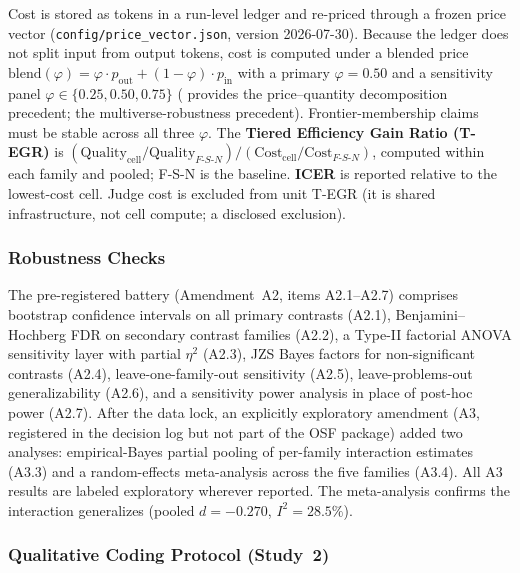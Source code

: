 \documentclass[12pt,a4paper]{article}
\newcommand{\phiBlend}{\varphi}
\begin{document}
Cost is stored as tokens in a run-level ledger and re-priced through a frozen
price vector (\texttt{config/price\_vector.json}, version 2026-07-30). Because
the ledger does not split input from output tokens, cost is computed under a
blended price $\mathrm{blend}(\phiBlend) = \phiBlend \cdot p_{\mathrm{out}} +
(1 - \phiBlend) \cdot p_{\mathrm{in}}$ with a primary $\phiBlend = 0.50$ and a
sensitivity panel $\phiBlend \in \{0.25, 0.50, 0.75\}$ (\citealt{Diewert1976}
provides the price--quantity decomposition precedent; \citealt{SteegenEtAl2016}
the multiverse-robustness precedent). Frontier-membership claims must be stable
across all three $\phiBlend$. The \textbf{Tiered Efficiency Gain Ratio (T-EGR)}
is $(\mathrm{Quality}_{\mathrm{cell}} / \mathrm{Quality}_{F\text{-}S\text{-}N})
/ (\mathrm{Cost}_{\mathrm{cell}} / \mathrm{Cost}_{F\text{-}S\text{-}N})$,
computed within each family and pooled; F-S-N is the baseline. \textbf{ICER} is
reported relative to the lowest-cost cell. Judge cost is excluded from unit T-EGR
(it is shared infrastructure, not cell compute; a disclosed exclusion).

\subsubsection{Robustness Checks}

The pre-registered battery (Amendment~A2, items A2.1--A2.7) comprises
bootstrap confidence intervals on all primary contrasts (A2.1),
Benjamini--Hochberg FDR on secondary contrast families (A2.2), a Type-II
factorial ANOVA sensitivity layer with partial $\eta^2$ (A2.3), JZS Bayes
factors for non-significant contrasts (A2.4), leave-one-family-out
sensitivity (A2.5), leave-problems-out generalizability (A2.6), and a
sensitivity power analysis in place of post-hoc power (A2.7). After the data
lock, an explicitly exploratory amendment (A3, registered in the decision log
but not part of the OSF package) added two analyses: empirical-Bayes partial
pooling of per-family interaction estimates (A3.3) and a random-effects
meta-analysis across the five families (A3.4). All A3 results are labeled
exploratory wherever reported. The meta-analysis confirms the interaction
generalizes (pooled $d = -0.270$, $I^2 = 28.5\%$).

\subsubsection{Qualitative Coding Protocol (Study~2)}\label{sec:qual-coding}
\end{document}
